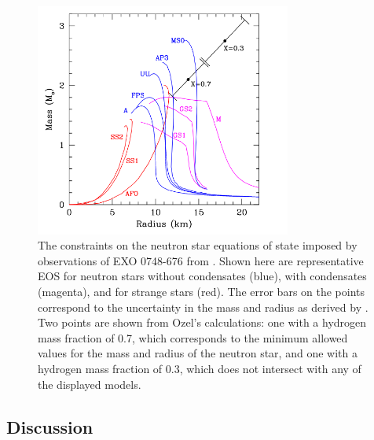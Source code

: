\documentclass[onecolumn]{aastex63}
\begin{document}
\begin{figure}
    \centering
    \includegraphics[width=0.75\textwidth]{ozel.png}
    \caption{The constraints on the neutron star equations of state imposed by observations of EXO 0748-676 from \cite{ozel2006}. Shown here are representative EOS for neutron stars without condensates (blue), with condensates (magenta), and for strange stars (red). The error bars on the points correspond to the uncertainty in the mass and radius as derived by \cite{ozel2006}. Two points are shown from Ozel's calculations: one with a hydrogen mass fraction of 0.7, which corresponds to the minimum allowed values for the mass and radius of the neutron star, and one with a hydrogen mass fraction of 0.3, which does not intersect with any of the displayed models.}
    \label{fig:ozel}
\end{figure}


\subsection{Discussion}
\end{document}
